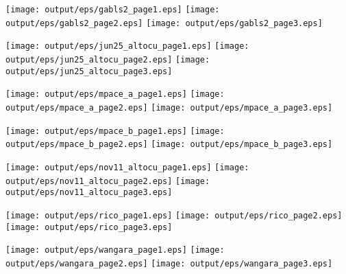 \documentclass[11pt]{article}
\begin{document}
\begin{center}

\texttt{[image: output/eps/gabls2\_page1.eps]}
\texttt{[image: output/eps/gabls2\_page2.eps]}
\texttt{[image: output/eps/gabls2\_page3.eps]}
\end{center}
\newpage

\begin{center}

\texttt{[image: output/eps/jun25\_altocu\_page1.eps]}
\texttt{[image: output/eps/jun25\_altocu\_page2.eps]}
\texttt{[image: output/eps/jun25\_altocu\_page3.eps]}
\end{center}
\newpage

\begin{center}

\texttt{[image: output/eps/mpace\_a\_page1.eps]}
\texttt{[image: output/eps/mpace\_a\_page2.eps]}
\texttt{[image: output/eps/mpace\_a\_page3.eps]}
\end{center}
\newpage

\begin{center}

\texttt{[image: output/eps/mpace\_b\_page1.eps]}
\texttt{[image: output/eps/mpace\_b\_page2.eps]}
\texttt{[image: output/eps/mpace\_b\_page3.eps]}
\end{center}
\newpage

\begin{center}

\texttt{[image: output/eps/nov11\_altocu\_page1.eps]}
\texttt{[image: output/eps/nov11\_altocu\_page2.eps]}
\texttt{[image: output/eps/nov11\_altocu\_page3.eps]}
\end{center}
\newpage

\begin{center}

\texttt{[image: output/eps/rico\_page1.eps]}
\texttt{[image: output/eps/rico\_page2.eps]}
\texttt{[image: output/eps/rico\_page3.eps]}
\end{center}
\newpage

\begin{center}

\texttt{[image: output/eps/wangara\_page1.eps]}
\texttt{[image: output/eps/wangara\_page2.eps]}
\texttt{[image: output/eps/wangara\_page3.eps]}
\end{center}
\newpage
\end{document}
